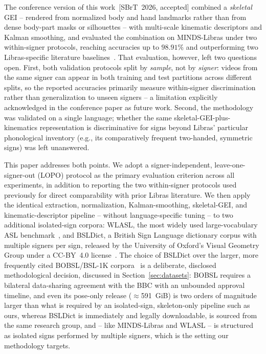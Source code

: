 \documentclass[journal]{IEEEtran}
\begin{document}
The conference version of this work~[SBrT~2026, accepted] combined a \emph{skeletal} GEI -- rendered from normalized body and hand landmarks rather than from dense body-part masks or silhouettes -- with multi-scale kinematic descriptors and Kalman smoothing, and evaluated the combination on MINDS-Libras under two within-signer protocols, reaching accuracies up to $98.91\%$ and outperforming two Libras-specific literature baselines~\cite{passos2021,rego2025}. That evaluation, however, left two questions open. First, both validation protocols split by \emph{sample}, not by \emph{signer}: videos from the same signer can appear in both training and test partitions across different splits, so the reported accuracies primarily measure within-signer discrimination rather than generalization to unseen signers -- a limitation explicitly acknowledged in the conference paper as future work. Second, the methodology was validated on a single language; whether the same skeletal-GEI-plus-kinematics representation is discriminative for signs beyond Libras' particular phonological inventory (e.g., its comparatively frequent two-handed, symmetric signs) was left unanswered.

This paper addresses both points. We adopt a signer-independent, leave-one-signer-out (LOPO) protocol as the primary evaluation criterion across all experiments, in addition to reporting the two within-signer protocols used previously for direct comparability with prior Libras literature. We then apply the identical extraction, normalization, Kalman-smoothing, skeletal-GEI, and kinematic-descriptor pipeline -- without language-specific tuning -- to two additional isolated-sign corpora: WLASL, the most widely used large-vocabulary ASL benchmark~\cite{wlasl2020}, and BSLDict, a British Sign Language dictionary corpus with multiple signers per sign, released by the University of Oxford's Visual Geometry Group under a CC-BY~4.0 license~\cite{momeni2020bsldict}. The choice of BSLDict over the larger, more frequently cited BOBSL/BSL-1K corpora~\cite{albanie2020bsl1k,albanie2021bobsl} is a deliberate, disclosed methodological decision, discussed in Section~\ref{sec:datasets}: BOBSL requires a bilateral data-sharing agreement with the BBC with an unbounded approval timeline, and even its pose-only release ($\approx$591~GiB) is two orders of magnitude larger than what is required by an isolated-sign, skeleton-only pipeline such as ours, whereas BSLDict is immediately and legally downloadable, is sourced from the same research group, and -- like MINDS-Libras and WLASL -- is structured as isolated signs performed by multiple signers, which is the setting our methodology targets.
\end{document}

